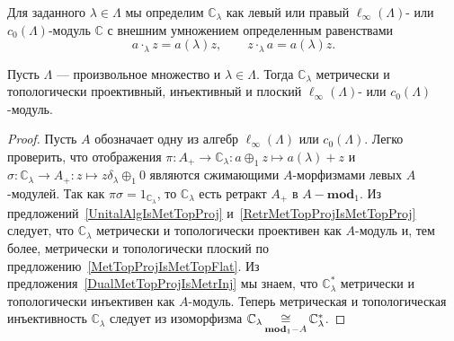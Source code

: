 Для заданного $\lambda\in\Lambda$ мы определим $\mathbb{C}_\lambda$ как левый
или правый $\ell_\infty(\Lambda)$- или $c_0(\Lambda)$-модуль $\mathbb{C}$ с
внешним умножением определенным равенствами
$$
a\cdot_\lambda z=a(\lambda)z,\qquad z\cdot_\lambda a=a(\lambda) z.
$$

\begin{proposition}\label{OneDimlInftyc0ModMetTopProjIngFlat} Пусть $\Lambda$
--- произвольное множество и $\lambda\in\Lambda$. Тогда $\mathbb{C}_\lambda$
метрически и топологически проективный, инъективный и плоский
$\ell_\infty(\Lambda)$- или $c_0(\Lambda)$-модуль.
\end{proposition}
\begin{proof} Пусть $A$ обозначает одну из алгебр $\ell_\infty(\Lambda)$ или
$c_0(\Lambda)$. Легко проверить, что отображения
$\pi:A_+\to\mathbb{C}_\lambda:a\oplus_1 z\mapsto a(\lambda)+z$ и
$\sigma:\mathbb{C}_\lambda\to A_+:z\mapsto z\delta_\lambda\oplus_1 0$ являются
сжимающими $A$-морфизмами левых $A$-модулей. Так как
$\pi\sigma=1_{\mathbb{C}_\lambda}$, то $\mathbb{C}_\lambda$ есть ретракт $A_+$ в
$A-\mathbf{mod}_1$. Из предложений~\ref{UnitalAlgIsMetTopProj}
и~\ref{RetrMetTopProjIsMetTopProj} следует, что $\mathbb{C}_\lambda$ метрически
и топологически проективен как $A$-модуль и, тем более, метрически и
топологически плоский по предложению~\ref{MetTopProjIsMetTopFlat}. Из
предложения~\ref{DualMetTopProjIsMetrInj} мы знаем, что $\mathbb{C}_\lambda^*$
метрически и топологически инъективен как $A$-модуль. Теперь метрическая и
топологическая инъективность $\mathbb{C}_\lambda$ следует из изоморфизма
$\mathbb{C}_\lambda\mathop{\mathbin{\cong}}\limits_{\mathbf{mod}_1-A}\mathbb{C}_\lambda^*$.
\end{proof}

